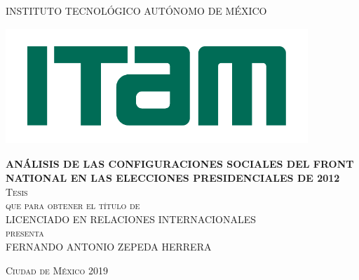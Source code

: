 \begin{titlepage}

\begin{center}

\textsc{\large{INSTITUTO TECNOLÓGICO AUTÓNOMO DE MÉXICO}}\\[2.2em]

\begin{center}
	\includegraphics[width=11.4cm, height = 4.4cm]{Figs/logo-ITAM.pdf}
\end{center}

\textsc{\large \textbf{ANÁLISIS DE LAS CONFIGURACIONES SOCIALES DEL FRONT NATIONAL EN LAS ELECCIONES PRESIDENCIALES DE 2012}}\\[2.2em]

\textsc{\large Tesis}\\[2em]

\textsc{que para obtener el título de}\\[1em]

\textsc{LICENCIADO EN RELACIONES INTERNACIONALES}\\[1em]

\textsc{presenta}\\[2.2em]

\textsc{\Large FERNANDO ANTONIO ZEPEDA HERRERA}\\[2.2em]


\end{center}

\vspace*{\fill}
\textsc{Ciudad de México \hspace*{\fill} 2019}

\end{titlepage}